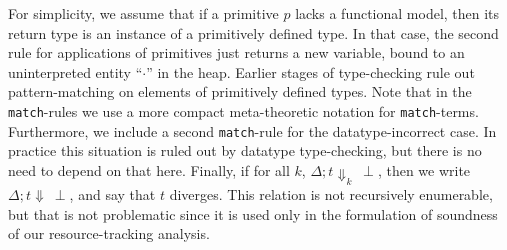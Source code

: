 \documentclass[9pt,natbib]{sigplanconf}
\begin{document}
 For simplicity, we assume that if a primitive $p$ lacks a functional
 model, then its return type is an instance of a primitively defined
 type.  In that case, the second rule for applications of primitives
 just returns a new variable, bound to an uninterpreted entity
 ``$\cdot$'' in the heap.  Earlier stages of type-checking rule out
 pattern-matching on elements of primitively defined types.  Note that
 in the \texttt{match}-rules we use a more compact meta-theoretic
 notation for \texttt{match}-terms.  Furthermore, we include a second
 \texttt{match}-rule for the datatype-incorrect case.  In practice
 this situation is ruled out by datatype type-checking, but there is
 no need to depend on that here.  Finally, if for all $k$, $\Delta;
 t\Downarrow_k\ \perp$, then we write $\Delta; t\Downarrow\ \perp$, and
 say that $t$ diverges. This relation is not recursively enumerable,
 but that is not problematic since it is used only in the formulation
 of soundness of our resource-tracking analysis.
\end{document}
